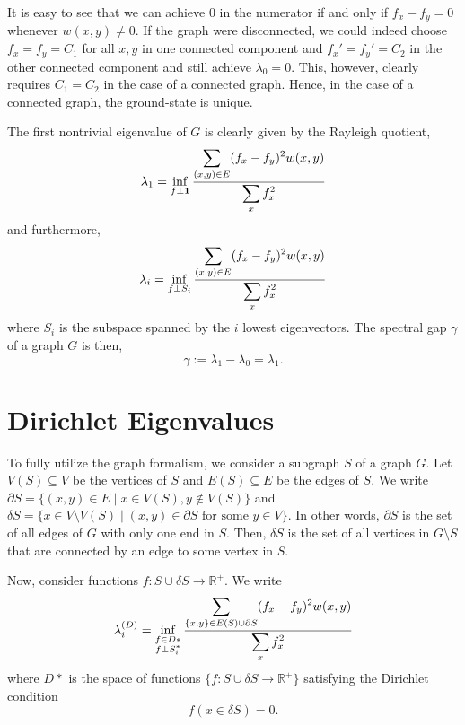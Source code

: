   It is easy to see that we can achieve 0 in the numerator if and only if $f_x - f_y = 0$ whenever $w(x,y)\neq 0$. If the graph were disconnected, we could indeed choose $f_x = f_y = C_1$ for all $x,y$ in one connected component and $f_x' = f_y' = C_2$ in the other connected component and still achieve $\lambda_0 = 0$. This, however, clearly requires $C_1 = C_2$ in the case of a connected graph. Hence, in the case of a connected graph, the ground-state is unique.
  
  The first nontrivial eigenvalue of $G$ is clearly given by the Rayleigh quotient,
  \begin{equation*}
      \lambda_1 = \inf_{f \perp \mathbf{1}} \frac{\displaystyle \sum_{(x,y) \in E}(f_x - f_y)^2 w(x,y)}{\displaystyle \sum_{x} f_x^2}
  \end{equation*}
  and furthermore,
  \begin{equation}\label{eqn:graph-eigenvalues}
      \lambda_i = \inf_{f \perp S_{i}} \frac{\displaystyle \sum_{(x,y) \in E}(f_x - f_y)^2 w(x,y)}{\displaystyle \sum_{x} f_x^2}
  \end{equation}
  where $S_i$ is the subspace spanned by the $i$ lowest eigenvectors. The spectral gap $\gamma$ of a graph $G$ is then,
  \[
      \gamma := \lambda_1 - \lambda_0 = \lambda_1.
  \]
  

\section{Dirichlet Eigenvalues}
  To fully utilize the graph formalism, we consider a subgraph $S$ of a graph $G$. Let $V(S) \subseteq V$ be the vertices of $S$ and $E(S) \subseteq E$ be the edges of $S$. We write $\partial S = \{ (x,y) \in E \; \vert \; x \in V(S), y \notin V(S) \}$ and $\delta S = \{ x \in V \setminus V(S) \; \vert \; (x,y) \in \partial S \text{ for some } y \in V \}$. In other words, $\partial S$ is the set of all edges of $G$ with only one end in $S$. Then, $\delta S$ is the set of all vertices in $G \setminus S$ that are connected by an edge to some vertex in $S$.
  
  Now, consider functions $f: S \cup \delta S \rightarrow \mathbb{R}^{+}$. We write 
  \begin{equation}\label{eqn:dirichlet-eigenvalues}
    \lambda_i^{(D)} = \inf_{\substack{f\in D* \\ f \perp S_{i}^*}} \frac{\displaystyle \sum_{\{x,y\} \in E(S)\cup \partial S}(f_x - f_y)^2 w(x,y)}{\displaystyle \sum_{x} f_x^2}
  \end{equation}
  where $D*$ is the space of functions $\{f: S \cup \delta S \rightarrow \mathbb{R}^{+} \}$ satisfying the Dirichlet condition
  \[
    f(x \in \delta S) = 0.
  \]
  
